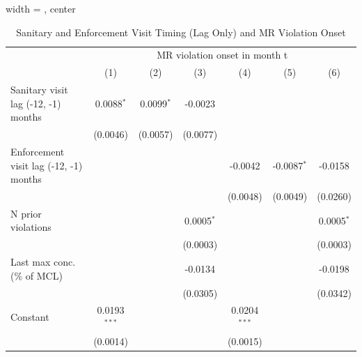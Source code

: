 
\begin{table}[htbp]
   
   \caption{\label{tab:sanitary_visit_mr_violation_iterative_lagonly_test} Sanitary and Enforcement Visit Timing (Lag Only) and MR Violation Onset}
   \bigskip
   
   \centering
   
   \begin{adjustbox}{width = \textwidth, center}
      
      
      \begin{tabular}{lcccccc}
         \toprule
         
          & \multicolumn{6}{c}{MR violation onset in month t}\\
         
                                                & (1)            & (2)           & (3)           & (4)            & (5)           & (6)\\  
         
         \midrule 
         Sanitary visit lag (-12, -1) months    & 0.0088$^{*}$   & 0.0099$^{*}$  & -0.0023       &                &               &   \\   
                                                & (0.0046)       & (0.0057)      & (0.0077)      &                &               &   \\   
         Enforcement visit lag (-12, -1) months &                &               &               & -0.0042        & -0.0087$^{*}$ & -0.0158\\   
                                                &                &               &               & (0.0048)       & (0.0049)      & (0.0260)\\   
         N prior violations                     &                &               & 0.0005$^{*}$  &                &               & 0.0005$^{*}$\\   
                                                &                &               & (0.0003)      &                &               & (0.0003)\\   
         Last max conc. (\% of MCL)             &                &               & -0.0134       &                &               & -0.0198\\   
                                                &                &               & (0.0305)      &                &               & (0.0342)\\   
         Constant                               & 0.0193$^{***}$ &               &               & 0.0204$^{***}$ &               &   \\   
                                                & (0.0014)       &               &               & (0.0015)       &               &   \\   
         

\end{tabular}
\end{adjustbox}
\end{table}
